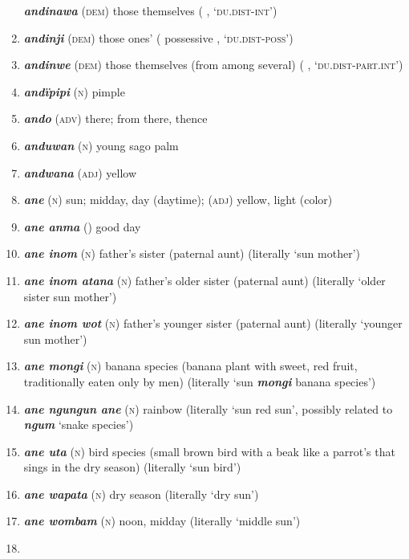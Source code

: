 \begin{enumerate}[noitemsep, label={}, align=left, widest=190, labelsep=1ex,leftmargin=*,itemindent=-10pt]
\textbf{\textit{andinawa}} (\textsc{dem}) those themselves (   , \linebreak‘\textsc{du.dist-int}’) \item 
\textbf{\textit{andinji}} (\textsc{dem}) those ones’ (  possessive , ‘\textsc{du.dist-poss}’) \item 
\textbf{\textit{andinwe}} (\textsc{dem}) those themselves (from among several) (  \linebreak {} , ‘\textsc{du.dist-part.int}’) \item 
\textbf{\textit{andïpipi}} (\textsc{n}) pimple \item 
\textbf{\textit{ando}} (\textsc{adv}) there; from there, thence \item 
\textbf{\textit{anduwan}} (\textsc{n}) young sago palm \item 
\textbf{\textit{andwana}} (\textsc{adj}) yellow \item 
\textbf{\textit{ane}} (\textsc{n}) sun; midday, day (daytime); (\textsc{adj}) yellow, light (color) \item 
\textbf{\textit{ane anma}} () good day \item 
\textbf{\textit{ane inom}} (\textsc{n}) father’s sister (paternal aunt) (literally ‘sun mother’) \item 
\textbf{\textit{ane inom atana}} (\textsc{n}) father’s older sister (paternal aunt) (literally ‘older sister sun mother’) \item 
\textbf{\textit{ane inom wot}} (\textsc{n}) father’s younger sister (paternal aunt) (literally ‘younger sun mother’) \item 
\textbf{\textit{ane mongi}} (\textsc{n}) banana species (banana plant with sweet, red fruit, traditionally eaten only by men) (literally ‘sun \textbf{\textit{mongi}} banana species’) \item 
\textbf{\textit{ane ngungun ane}} (\textsc{n}) rainbow (literally ‘sun red sun’, possibly related to \textbf{\textit{ngum}} ‘snake species’) \item 
\textbf{\textit{ane uta}} (\textsc{n}) bird species (small brown bird with a beak like a parrot’s that sings in the dry season) (literally ‘sun bird’) \item 
\textbf{\textit{ane wapata}} (\textsc{n}) dry season (literally ‘dry sun’) \item 
\textbf{\textit{ane wombam}} (\textsc{n}) noon, midday (literally ‘middle sun’) \item 

\end{enumerate}
